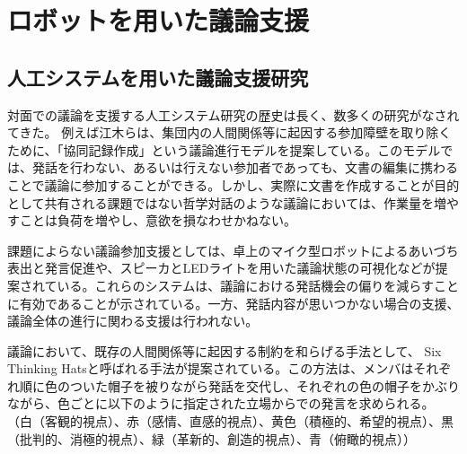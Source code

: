 \documentclass[11pt, a4paper]{jreport} %
\begin{document}



\chapter{ロボットを用いた議論支援}

\section{人工システムを用いた議論支援研究}

対面での議論を支援する人工システム研究の歴史は長く、数多くの研究がなされてきた。
例えば江木らは、集団内の人間関係等に起因する参加障壁を取り除くために、「協同記録作成」という議論進行モデルを提案している\cite{weko_11019_1}。このモデルでは、発話を行わない、あるいは行えない参加者であっても、文書の編集に携わることで議論に参加することができる。しかし、実際に文書を作成することが目的として共有される課題ではない哲学対話のような議論においては、作業量を増やすことは負荷を増やし、意欲を損なわせかねない。


課題によらない議論参加支援としては、卓上のマイク型ロボットによるあいづち表出と発言促進\cite{8673013}や、スピーカとLEDライトを用いた議論状態の可視化\cite{led}などが提案されている。これらのシステムは、議論における発話機会の偏りを減らすことに有効であることが示されている。一方、発話内容が思いつかない場合の支援、議論全体の進行に関わる支援は行われない。


議論において、既存の人間関係等に起因する制約を和らげる手法として、
Six Thinking Hats\cite{de1985six}と呼ばれる手法が提案されている。この方法は、メンバはそれぞれ順に色のついた帽子を被りながら発話を交代し、それぞれの色の帽子をかぶりながら、色ごとに以下のように指定された立場からでの発言を求められる。
（白（客観的視点）、赤（感情、直感的視点）、黄色（積極的、希望的視点）、黒（批判的、消極的視点）、緑（革新的、創造的視点）、青（俯瞰的視点））
\end{document}
